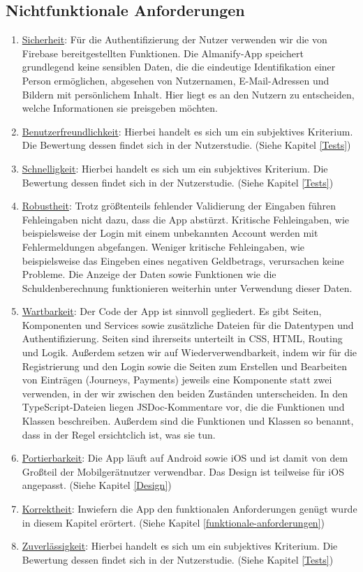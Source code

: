 \subsection{Nichtfunktionale Anforderungen}
\begin{enumerate}
	\item \underline{Sicherheit}: Für die Authentifizierung der Nutzer verwenden wir die von Firebase bereitgestellten Funktionen.
	Die Almanify-App speichert grundlegend keine sensiblen Daten, die die eindeutige Identifikation einer Person ermöglichen, abgesehen von Nutzernamen, E-Mail-Adressen und Bildern mit persönlichem Inhalt.
	Hier liegt es an den Nutzern zu entscheiden, welche Informationen sie preisgeben möchten. 
	\item \underline{Benutzerfreundlichkeit}: Hierbei handelt es sich um ein subjektives Kriterium.
	Die Bewertung dessen findet sich in der Nutzerstudie. (Siehe Kapitel \ref{Tests})
	\item \underline{Schnelligkeit}: Hierbei handelt es sich um ein subjektives Kriterium.
	Die Bewertung dessen findet sich in der Nutzerstudie. (Siehe Kapitel \ref{Tests})
	\item \underline{Robustheit}: Trotz größtenteils fehlender Validierung der Eingaben führen Fehleingaben nicht dazu, dass die App abstürzt.
	Kritische Fehleingaben, wie beispielsweise der Login mit einem unbekannten Account werden mit Fehlermeldungen abgefangen.
	Weniger kritische Fehleingaben, wie beispielsweise das Eingeben eines negativen Geldbetrags, verursachen keine Probleme.
	Die Anzeige der Daten sowie Funktionen wie die Schuldenberechnung funktionieren weiterhin unter Verwendung dieser Daten.
	\item \underline{Wartbarkeit}: Der Code der App ist sinnvoll gegliedert.
	Es gibt Seiten, Komponenten und Services sowie zusätzliche Dateien für die Datentypen und Authentifizierung.
	Seiten sind ihrerseits unterteilt in CSS, HTML, Routing und Logik.
	Außerdem setzen wir auf Wiederverwendbarkeit, indem wir für die Registrierung und den Login sowie die Seiten zum Erstellen und Bearbeiten von Einträgen (Journeys, Payments) jeweils eine Komponente statt zwei verwenden, in der wir zwischen den beiden Zuständen unterscheiden.
	In den TypeScript-Dateien liegen JSDoc-Kommentare vor, die die Funktionen und Klassen beschreiben.
	Außerdem sind die Funktionen und Klassen so benannt, dass in der Regel ersichtclich ist, was sie tun.
	\item \underline{Portierbarkeit}: Die App läuft auf Android sowie iOS und ist damit von dem Großteil der Mobilgerätnutzer verwendbar.
	Das Design ist teilweise für iOS angepasst. (Siehe Kapitel \ref{Design})
	\item \underline{Korrektheit}: Inwiefern die App den funktionalen Anforderungen genügt wurde in diesem Kapitel erörtert.
	(Siehe Kapitel \ref{funktionale-anforderungen})
	\item \underline{Zuverlässigkeit}: Hierbei handelt es sich um ein subjektives Kriterium.
	Die Bewertung dessen findet sich in der Nutzerstudie. (Siehe Kapitel \ref{Tests})
				
\end{enumerate}






